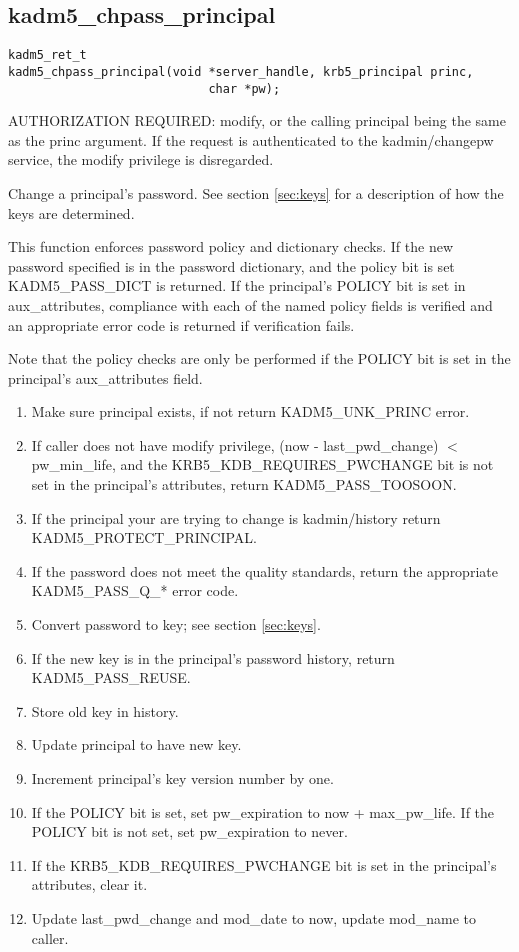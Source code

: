 \subsection{kadm5_chpass_principal}

\begin{verbatim}
kadm5_ret_t
kadm5_chpass_principal(void *server_handle, krb5_principal princ,
                            char *pw);
\end{verbatim}

AUTHORIZATION REQUIRED: modify, or the calling principal being the
same as the princ argument.  If the request is authenticated to the
kadmin/changepw service, the modify privilege is disregarded.

Change a principal's password.   See section \ref{sec:keys} for a
description of how the keys are determined.

This function enforces password policy and dictionary checks.  If the new
password specified is in the password dictionary, and the policy bit is set
KADM5_PASS_DICT is returned.  If the principal's POLICY bit is set in
aux_attributes, compliance with each of the named policy fields is verified
and an appropriate error code is returned if verification fails.

Note that the policy checks are only be performed if the POLICY bit is
set in the principal's aux_attributes field.

\begin{enumerate}
\item Make sure principal exists, if not return KADM5_UNK_PRINC error.
\item If caller does not have modify privilege, (now - last_pwd_change) $<$
pw_min_life, and the KRB5_KDB_REQUIRES_PWCHANGE bit is not set in the
principal's attributes, return KADM5_PASS_TOOSOON.
\item If the principal your are trying to change is kadmin/history
return KADM5_PROTECT_PRINCIPAL.
\item If the password does not meet the quality
standards, return the appropriate KADM5_PASS_Q_* error code.
\item Convert password to key; see section \ref{sec:keys}.
\item If the new key is in the principal's password history, return
KADM5_PASS_REUSE.
\item Store old key in history.
\item Update principal to have new key.
\item Increment principal's key version number by one.
\item If the POLICY bit is set, set pw_expiration to now +
max_pw_life.  If the POLICY bit is not set, set pw_expiration to
never.
\item If the KRB5_KDB_REQUIRES_PWCHANGE bit is set in the principal's
attributes, clear it.
\item Update last_pwd_change and mod_date to now, update mod_name to
caller.
\end{enumerate}

